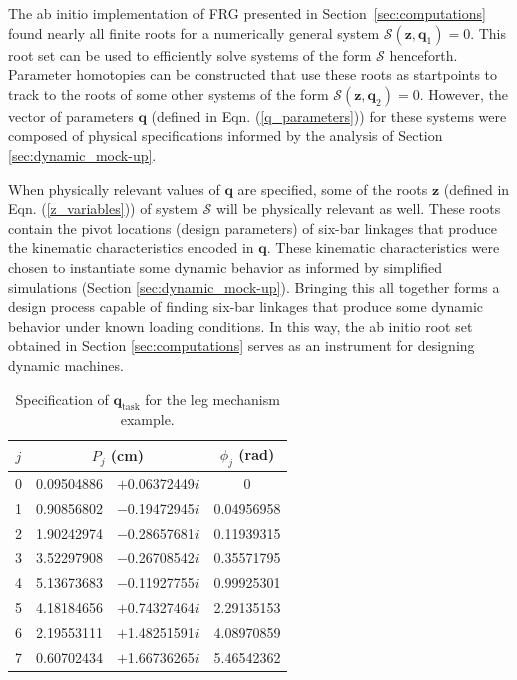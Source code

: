 \documentclass[journal]{IEEEtran}
\begin{document}
The ab initio implementation of FRG presented in Section~\ref{sec:computations} found nearly all finite roots for a numerically general system $\mathcal{S}(\mathbf{z},\mathbf{q}_1)=0$.
This root set can be used to efficiently solve systems of the form $\mathcal{S}$ henceforth.
Parameter homotopies can be constructed that use these roots as startpoints to track to the roots of some other systems of the form $\mathcal{S}(\mathbf{z},\mathbf{q}_2)=0$.
However, the vector of parameters $\mathbf{q}$ (defined in Eqn. (\ref{q_parameters})) for these systems were composed of physical specifications informed by the analysis of Section \ref{sec:dynamic_mock-up}.

When physically relevant values of $\mathbf{q}$ are specified, some of the roots $\mathbf{z}$ (defined in Eqn. (\ref{z_variables})) of system $\mathcal{S}$ will be physically relevant as well.
These roots contain the pivot locations (design parameters) of six-bar linkages that produce the kinematic characteristics encoded in $\mathbf{q}$.
These kinematic characteristics were chosen to instantiate some dynamic behavior as informed by simplified simulations (Section \ref{sec:dynamic_mock-up}).
Bringing this all together forms a design process capable of finding six-bar linkages that produce some dynamic behavior under known loading conditions.
In this way, the ab initio root set obtained in Section \ref{sec:computations} serves as an instrument for designing dynamic machines.


\begin{table}[t]
\caption{Specification of $\mathbf{q}_\text{task}$ for the leg mechanism example.}
\label{task_parameters}
\centering
\begin{tabular}{c|r@{}lc}
$j$ & \multicolumn{2}{c}{$P_j$ (cm)} & \multicolumn{1}{c}{$\phi_j$ (rad)} \\
\hline
0 & 0.09504886 & $+$0.06372449$i$ & 0 \\
1 & 0.90856802 & $-$0.19472945$i$ & 0.04956958 \\
2 & 1.90242974 & $-$0.28657681$i$ & 0.11939315 \\
3 & 3.52297908 & $-$0.26708542$i$ & 0.35571795 \\
4 & 5.13673683 & $-$0.11927755$i$ & 0.99925301 \\
5 & 4.18184656 & $+$0.74327464$i$ & 2.29135153 \\
6 & 2.19553111 & $+$1.48251591$i$ & 4.08970859 \\
7 & 0.60702434 & $+$1.66736265$i$ & 5.46542362 \\
\end{tabular}
\end{table}
\end{document}
